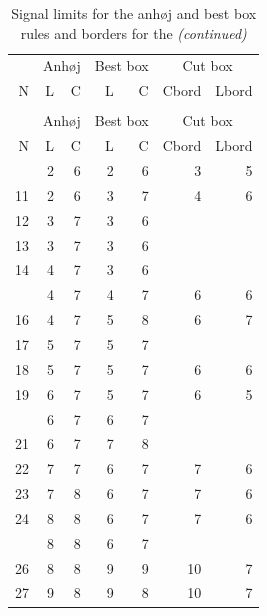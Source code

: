 \begin{Schunk}

\begin{longtable}{rrrrrrr}
\caption{\label{tab:unnamed-chunk-1}Signal limits for the anhøj and best box rules and borders for the cut
        box rules. N = number of trials. L = upper limit for longest run,
        C = lower limit for number of crossings, Cbord and Lbord = cut box
        borders to keep.}\\
\toprule
\multicolumn{1}{c}{ } & \multicolumn{2}{c}{Anhøj} & \multicolumn{2}{c}{Best box} & \multicolumn{2}{c}{Cut box} \\
\cmidrule(l{3pt}r{3pt}){2-3} \cmidrule(l{3pt}r{3pt}){4-5} \cmidrule(l{3pt}r{3pt}){6-7}
N & L & C & L & C & Cbord & Lbord\\
\midrule
\endfirsthead
\caption[]{Signal limits for the anhøj and best box rules and borders for the  \textit{(continued)}}\\
\toprule
\multicolumn{1}{c}{ } & \multicolumn{2}{c}{Anhøj} & \multicolumn{2}{c}{Best box} & \multicolumn{2}{c}{Cut box} \\
\cmidrule(l{3pt}r{3pt}){2-3} \cmidrule(l{3pt}r{3pt}){4-5} \cmidrule(l{3pt}r{3pt}){6-7}
N & L & C & L & C & Cbord & Lbord\\
\midrule
\endhead
\
\endfoot
\bottomrule
\endlastfoot
10 & 2 & 6 & 2 & 6 & 3 & 5\\
11 & 2 & 6 & 3 & 7 & 4 & 6\\
12 & 3 & 7 & 3 & 6 &  & \\
13 & 3 & 7 & 3 & 6 &  & \\
14 & 4 & 7 & 3 & 6 &  & \\
\addlinespace
15 & 4 & 7 & 4 & 7 & 6 & 6\\
16 & 4 & 7 & 5 & 8 & 6 & 7\\
17 & 5 & 7 & 5 & 7 &  & \\
18 & 5 & 7 & 5 & 7 & 6 & 6\\
19 & 6 & 7 & 5 & 7 & 6 & 5\\
\addlinespace
20 & 6 & 7 & 6 & 7 &  & \\
21 & 6 & 7 & 7 & 8 &  & \\
22 & 7 & 7 & 6 & 7 & 7 & 6\\
23 & 7 & 8 & 6 & 7 & 7 & 6\\
24 & 8 & 8 & 6 & 7 & 7 & 6\\
\addlinespace
25 & 8 & 8 & 6 & 7 &  & \\
26 & 8 & 8 & 9 & 9 & 10 & 7\\
27 & 9 & 8 & 9 & 8 & 10 & 7\\

\end{longtable}
\end{Schunk}
